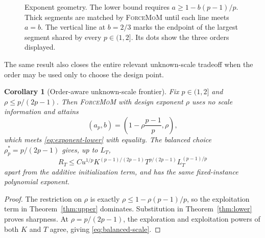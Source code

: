 \documentclass[twoside]{article}
\newtheorem{corollary}[theorem]{Corollary}
\newcommand{\FM}{\textnormal{\textsc{ForceMoM}}}
\begin{document}
\begin{figure}[t]
\centering
{}
\caption{Exponent geometry. The lower bound requires
$a\geq1-b(p-1)/p$. Thick segments are matched by \FM{} until each line meets
$a=b$. The vertical line at $b=2/3$ marks the endpoint of the largest segment
shared by every $p\in(1,2]$. Its dots show the three orders displayed.}
\label{fig:frontier}
\end{figure}

The same result also closes the entire relevant unknown-scale tradeoff when
the order may be used only to choose the design point.

\begin{corollary}[Order-aware unknown-scale frontier]
\label{cor:scale-frontier}
Fix $p\in(1,2]$ and $\rho\leq p/(2p-1)$. Then \FM{} with design exponent
$\rho$ uses no scale information and attains
\[
 (a_p,b)=\left(1-\rho\frac{p-1}{p},\rho\right),
\]
which meets \eqref{eq:exponent-lower} with equality. The balanced choice
$\rho_p^*=p/(2p-1)$ gives, up to $L_T$,
\begin{equation}
 R_T\leq C u^{1/p}
 K^{(p-1)/(2p-1)}T^{p/(2p-1)}L_T^{(p-1)/p}
 \label{eq:balanced-scale}
\end{equation}
apart from the additive initialization term, and has the same fixed-instance
polynomial exponent.
\end{corollary}

\begin{proof}
The restriction on $\rho$ is exactly
$\rho\leq1-\rho(p-1)/p$, so the exploitation term in
Theorem~\ref{thm:upper} dominates. Substitution in
Theorem~\ref{thm:lower} proves sharpness. At $\rho=p/(2p-1)$, the exploration
and exploitation powers of both $K$ and $T$ agree, giving
\eqref{eq:balanced-scale}.
\end{proof}
\end{document}

